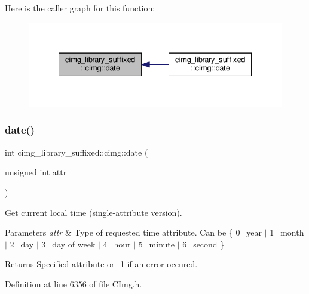 Here is the caller graph for this function\+:
\nopagebreak
\begin{figure}[H]
\begin{center}
\leavevmode
\includegraphics[width=334pt]{d4/d9b/namespacecimg__library__suffixed_1_1cimg_a6b6e28a991c9e426d8cb1c6d1e02849e_icgraph}
\end{center}
\end{figure}
\mbox{\label{namespacecimg__library__suffixed_1_1cimg_aac739bf544269324a04504ebe92b93e9}} 
\subsubsection{\texorpdfstring{date()}{date()}\hspace{0.1cm}{\footnotesize\ttfamily [2/2]}}
{\footnotesize\ttfamily int cimg\+\_\+library\+\_\+suffixed\+::cimg\+::date (\begin{DoxyParamCaption}\item[{unsigned int}]{attr }\end{DoxyParamCaption})\hspace{0.3cm}{\ttfamily [inline]}}



Get current local time (single-\/attribute version). 


\begin{DoxyParams}{Parameters}
{\em attr} & Type of requested time attribute. Can be \{ 0=year $\vert$ 1=month $\vert$ 2=day $\vert$ 3=day of week $\vert$ 4=hour $\vert$ 5=minute $\vert$ 6=second \} \\
\hline
\end{DoxyParams}
\begin{DoxyReturn}{Returns}
Specified attribute or -\/1 if an error occured. 
\end{DoxyReturn}


Definition at line 6356 of file C\+Img.\+h.

